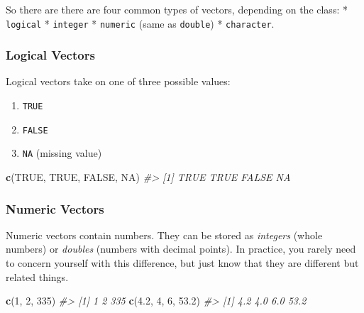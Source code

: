 \documentclass[]{book}
\newenvironment{Shaded}{\begin{snugshade}}{\end{snugshade}}
\newcommand{\KeywordTok}[1]{\textcolor[rgb]{0.13,0.29,0.53}{\textbf{#1}}}
\newcommand{\DecValTok}[1]{\textcolor[rgb]{0.00,0.00,0.81}{#1}}
\newcommand{\FloatTok}[1]{\textcolor[rgb]{0.00,0.00,0.81}{#1}}
\newcommand{\CommentTok}[1]{\textcolor[rgb]{0.56,0.35,0.01}{\textit{#1}}}
\newcommand{\OtherTok}[1]{\textcolor[rgb]{0.56,0.35,0.01}{#1}}
\newcommand{\NormalTok}[1]{#1}
\providecommand{\tightlist}{%
  \setlength{\itemsep}{0pt}\setlength{\parskip}{0pt}}
\begin{document}
So there are there are four common types of vectors, depending on the
class: * \texttt{logical} * \texttt{integer} * \texttt{numeric} (same as
\texttt{double}) * \texttt{character}.

\subsubsection*{Logical Vectors}\label{logical-vectors}

Logical vectors take on one of three possible values:

\begin{enumerate}
\def\labelenumi{\arabic{enumi}.}
\tightlist
\item
  \texttt{TRUE}
\item
  \texttt{FALSE}
\item
  \texttt{NA} (missing value)
\end{enumerate}

\begin{Shaded}
\begin{Highlighting}[]
\KeywordTok{c}\NormalTok{(}\OtherTok{TRUE}\NormalTok{, }\OtherTok{TRUE}\NormalTok{, }\OtherTok{FALSE}\NormalTok{, }\OtherTok{NA}\NormalTok{)}
\CommentTok{#> [1]  TRUE  TRUE FALSE    NA}
\end{Highlighting}
\end{Shaded}

\subsubsection*{Numeric Vectors}\label{numeric-vectors}

Numeric vectors contain numbers. They can be stored as \emph{integers}
(whole numbers) or \emph{doubles} (numbers with decimal points). In
practice, you rarely need to concern yourself with this difference, but
just know that they are different but related things.

\begin{Shaded}
\begin{Highlighting}[]
\KeywordTok{c}\NormalTok{(}\DecValTok{1}\NormalTok{, }\DecValTok{2}\NormalTok{, }\DecValTok{335}\NormalTok{)}
\CommentTok{#> [1]   1   2 335}
\KeywordTok{c}\NormalTok{(}\FloatTok{4.2}\NormalTok{, }\DecValTok{4}\NormalTok{, }\DecValTok{6}\NormalTok{, }\FloatTok{53.2}\NormalTok{)}
\CommentTok{#> [1]  4.2  4.0  6.0 53.2}
\end{Highlighting}
\end{Shaded}
\end{document}
